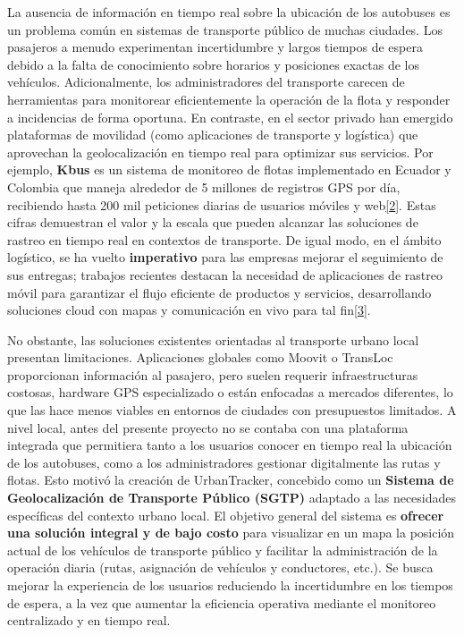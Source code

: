 La ausencia de información en tiempo real sobre la ubicación de los autobuses es un problema común en sistemas de transporte público de muchas ciudades. Los pasajeros a menudo experimentan incertidumbre y largos tiempos de espera debido a la falta de conocimiento sobre horarios y posiciones exactas de los vehículos. Adicionalmente, los administradores del transporte carecen de herramientas para monitorear eficientemente la operación de la flota y responder a incidencias de forma oportuna. En contraste, en el sector privado han emergido plataformas de movilidad (como aplicaciones de transporte y logística) que aprovechan la geolocalización en tiempo real para optimizar sus servicios. Por ejemplo, \textbf{Kbus} es un sistema de monitoreo de flotas implementado en Ecuador y Colombia que maneja alrededor de 5 millones de registros GPS por día, recibiendo hasta 200 mil peticiones diarias de usuarios móviles y web\href{https://dialnet.unirioja.es/servlet/articulo?codigo=7425696\#:~:text=,monolito\%20previo\%20se\%20encontraba\%20en}{{[}2{]}}. Estas cifras demuestran el valor y la escala que pueden alcanzar las soluciones de rastreo en tiempo real en contextos de transporte. De igual modo, en el ámbito logístico, se ha vuelto \textbf{imperativo} para las empresas mejorar el seguimiento de sus entregas; trabajos recientes destacan la necesidad de aplicaciones de rastreo móvil para garantizar el flujo eficiente de productos y servicios, desarrollando soluciones cloud con mapas y comunicación en vivo para tal fin\href{https://trid.trb.org/View/2571597\#:~:text=efficiency\%20for\%20product\%20delivery,for\%20server\%20setup\%2C\%20Docker\%2C\%20and}{{[}3{]}}.

No obstante, las soluciones existentes orientadas al transporte urbano local presentan limitaciones. Aplicaciones globales como Moovit o TransLoc proporcionan información al pasajero, pero suelen requerir infraestructuras costosas, hardware GPS especializado o están enfocadas a mercados diferentes, lo que las hace menos viables en entornos de ciudades con presupuestos limitados. A nivel local, antes del presente proyecto no se contaba con una plataforma integrada que permitiera tanto a los usuarios conocer en tiempo real la ubicación de los autobuses, como a los administradores gestionar digitalmente las rutas y flotas. Esto motivó la creación de UrbanTracker, concebido como un \textbf{Sistema de Geolocalización de Transporte Público (SGTP)} adaptado a las necesidades específicas del contexto urbano local. El objetivo general del sistema es \textbf{ofrecer una solución integral y de bajo costo} para visualizar en un mapa la posición actual de los vehículos de transporte público y facilitar la administración de la operación diaria (rutas, asignación de vehículos y conductores, etc.). Se busca mejorar la experiencia de los usuarios reduciendo la incertidumbre en los tiempos de espera, a la vez que aumentar la eficiencia operativa mediante el monitoreo centralizado y en tiempo real.

